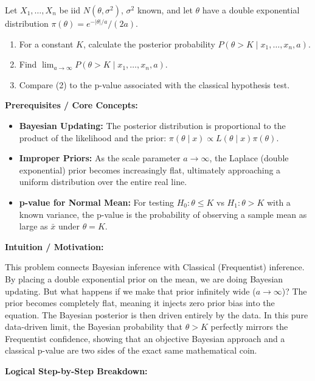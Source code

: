\begin{exercise}
\label{probability:2013:10}
Let $X_1, \dots, X_n$ be iid $N(\theta, \sigma^2)$, $\sigma^2$ known, and let $\theta$ have a double exponential distribution $\pi(\theta) = e^{-|\theta|/a} / (2a)$.
\begin{enumerate}
    \item For a constant $K$, calculate the posterior probability $P(\theta > K \mid x_1, \dots, x_n, a)$.
    \item Find $\lim_{a \to \infty} P(\theta > K \mid x_1, \dots, x_n, a)$.
    \item Compare (2) to the p-value associated with the classical hypothesis test.
\end{enumerate}
\end{exercise}

\begin{solution}
\textbf{Prerequisites / Core Concepts:}
\begin{itemize}
    \item \textbf{Bayesian Updating:} The posterior distribution is proportional to the product of the likelihood and the prior: $\pi(\theta \mid x) \propto L(\theta \mid x) \pi(\theta)$.
    \item \textbf{Improper Priors:} As the scale parameter $a \to \infty$, the Laplace (double exponential) prior becomes increasingly flat, ultimately approaching a uniform distribution over the entire real line.
    \item \textbf{p-value for Normal Mean:} For testing $H_0: \theta \leq K$ vs $H_1: \theta > K$ with a known variance, the p-value is the probability of observing a sample mean as large as $\bar{x}$ under $\theta = K$.
\end{itemize}

\textbf{Intuition / Motivation:}

This problem connects Bayesian inference with Classical (Frequentist) inference. By placing a double exponential prior on the mean, we are doing Bayesian updating. But what happens if we make that prior infinitely wide ($a \to \infty$)? The prior becomes completely flat, meaning it injects zero prior bias into the equation. The Bayesian posterior is then driven entirely by the data. In this pure data-driven limit, the Bayesian probability that $\theta > K$ perfectly mirrors the Frequentist confidence, showing that an objective Bayesian approach and a classical p-value are two sides of the exact same mathematical coin.

\textbf{Logical Step-by-Step Breakdown:}


\end{solution}
